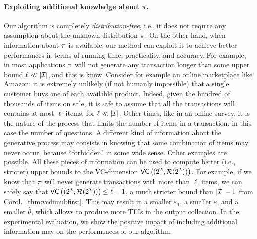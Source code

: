 \paragraph{Exploiting additional knowledge about $\pi$.} 
Our algorithm is completely \emph{distribution-free}, i.e., it does not require
any assumption about the unknown distribution $\pi$. On the other hand, when
information about $\pi$ is available, our method can exploit it to achieve
better performances in terms of running time, practicality, and accuracy. 
For example, in most applications $\pi$ will not generate any transaction
longer than some upper bound $\ell\ll|{\cal I}|$, and this is know. 
Consider for example an online
marketplace like Amazon: it is extremely unlikely (if not humanly impossible)
that a single customer buys one of each available product. Indeed, given the
hundred of thousands of items on sale, it is safe to assume that all the
transactions will contains at most $\ell$ items, for $\ell\ll|{\cal I}|$. Other
times, like in an online survey, it is the nature of the process that limits the
number of items in a transaction, in this case the number of questions. A
different kind of information about the generative process may consists in
knowing that some combination of items may never occur, because ``forbidden'' in
some wide sense. Other examples are possible. All these pieces of information
can be used to compute better (i.e., stricter) upper bounds to the VC-dimension
$\mathsf{VC}\left((2^{\cal I},\mathcal{R}(2^{\cal I}))\right)$. For example, if we know that $\pi$ will never generate
transactions with more than $\ell$ items, we can safely say that
$\mathsf{VC}\left((2^{\cal I},\mathcal{R}(2^{\cal I}))\right)\le \ell-1$, a much stricter bound than $|{\cal I}|-1$ from
Corol.~\ref{thm:vcdimubfirst}. This may result in a smaller $\varepsilon_1$, a smaller 
$\varepsilon$, and a smaller $\hat\theta$, which allows to produce
more TFIs in the output collection. In the experimental evaluation, we show the
positive impact of including additional information may on the performances of
our algorithm.
\fi
